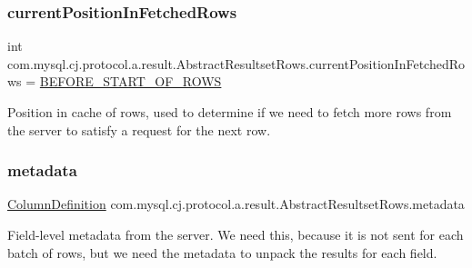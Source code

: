 \subsubsection{\texorpdfstring{current\+Position\+In\+Fetched\+Rows}{currentPositionInFetchedRows}}
{\footnotesize\ttfamily int com.\+mysql.\+cj.\+protocol.\+a.\+result.\+Abstract\+Resultset\+Rows.\+current\+Position\+In\+Fetched\+Rows = \mbox{\hyperlink{classcom_1_1mysql_1_1cj_1_1protocol_1_1a_1_1result_1_1_abstract_resultset_rows_a94be6a28f1ebe4c8bfe5b4907dc44083}{B\+E\+F\+O\+R\+E\+\_\+\+S\+T\+A\+R\+T\+\_\+\+O\+F\+\_\+\+R\+O\+WS}}\hspace{0.3cm}{\ttfamily [protected]}}

Position in cache of rows, used to determine if we need to fetch more rows from the server to satisfy a request for the next row. \mbox{\label{classcom_1_1mysql_1_1cj_1_1protocol_1_1a_1_1result_1_1_abstract_resultset_rows_a6198167d21b19a82cb1191eaf226cad2}} 
\subsubsection{\texorpdfstring{metadata}{metadata}}
{\footnotesize\ttfamily \mbox{\hyperlink{interfacecom_1_1mysql_1_1cj_1_1protocol_1_1_column_definition}{Column\+Definition}} com.\+mysql.\+cj.\+protocol.\+a.\+result.\+Abstract\+Resultset\+Rows.\+metadata\hspace{0.3cm}{\ttfamily [protected]}}

Field-\/level metadata from the server. We need this, because it is not sent for each batch of rows, but we need the metadata to unpack the results for each field. \mbox{\label{classcom_1_1mysql_1_1cj_1_1protocol_1_1a_1_1result_1_1_abstract_resultset_rows_ac0fe5a90927b98441be0c579daefbf7f}} 
